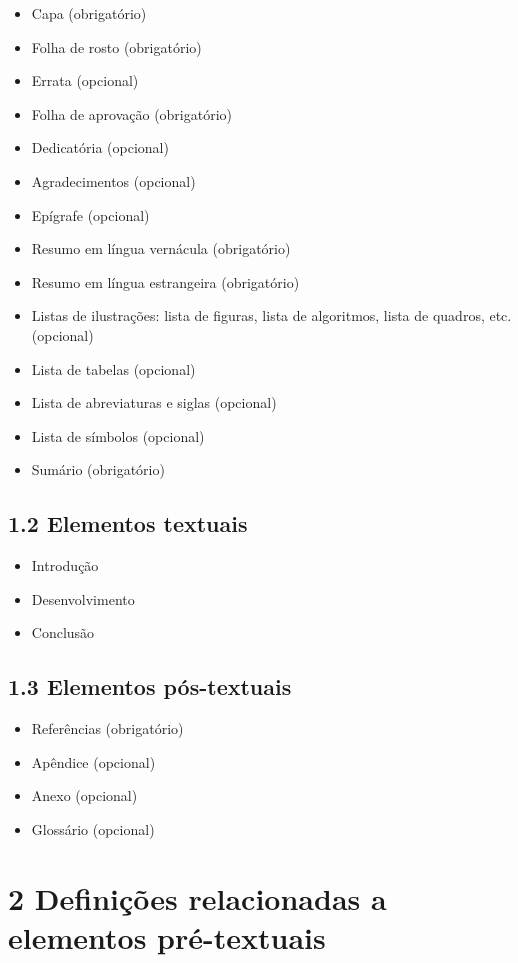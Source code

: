\documentclass[
	12pt,				%
	oneside,			%
	a4paper,			%
	english,			%
	brazil				%
	]{abntex2ppgsi}
\begin{document}
\begin{anexosenv}
\begin{itemize}
	\item Capa (obrigatório)
	\item	Folha de rosto (obrigatório)
	\item	Errata (opcional)
	\item	Folha de aprovação (obrigatório)
	\item	Dedicatória (opcional)
	\item	Agradecimentos (opcional)
	\item	Epígrafe (opcional)
	\item	Resumo em língua vernácula (obrigatório)
	\item	Resumo em língua estrangeira (obrigatório)
	\item	Listas de ilustrações: lista de figuras, lista de algoritmos, lista de quadros, etc. (opcional)
	\item	Lista de tabelas (opcional)
	\item	Lista de abreviaturas e siglas (opcional)
	\item	Lista de símbolos (opcional)
	\item	Sumário (obrigatório)
\end{itemize}

\subsection*{1.2 Elementos textuais}

\begin{itemize}
	\item	Introdução
	\item	Desenvolvimento
	\item	Conclusão
\end{itemize}

\subsection*{1.3 Elementos pós-textuais}

\begin{itemize}
	\item	Referências (obrigatório)
	\item	Apêndice (opcional)
	\item	Anexo (opcional)
	\item	Glossário (opcional)
\end{itemize}

\section*{2 Definições relacionadas a elementos pré-textuais}


\end{anexosenv}
\end{document}
